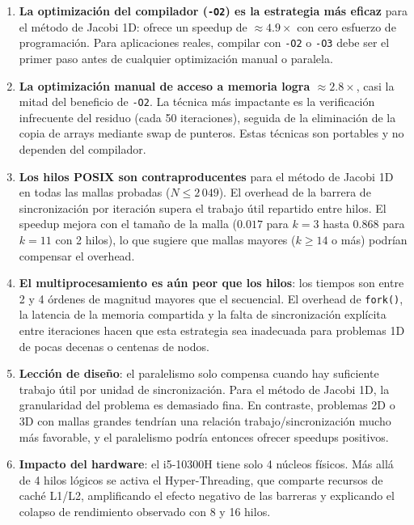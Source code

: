 \documentclass{article}
\begin{document}
\begin{enumerate}

  \item \textbf{La optimización del compilador (\texttt{-O2}) es la estrategia
    más eficaz} para el método de Jacobi 1D: ofrece un speedup de $\approx 4.9\times$
    con cero esfuerzo de programación.  Para aplicaciones reales, compilar con
    \texttt{-O2} o \texttt{-O3} debe ser el primer paso antes de cualquier
    optimización manual o paralela.

  \item \textbf{La optimización manual de acceso a memoria logra $\approx 2.8\times$},
    casi la mitad del beneficio de \texttt{-O2}.  La técnica más impactante es
    la verificación infrecuente del residuo (cada 50 iteraciones), seguida de
    la eliminación de la copia de arrays mediante swap de punteros.  Estas
    técnicas son portables y no dependen del compilador.

  \item \textbf{Los hilos POSIX son contraproducentes} para el método de Jacobi
    1D en todas las mallas probadas ($N \leq 2\,049$).  El overhead de la barrera
    de sincronización por iteración supera el trabajo útil repartido entre hilos.
    El speedup mejora con el tamaño de la malla ($0.017$ para $k=3$ hasta $0.868$
    para $k=11$ con 2 hilos), lo que sugiere que mallas mayores ($k \geq 14$ o
    más) podrían compensar el overhead.

  \item \textbf{El multiprocesamiento es aún peor que los hilos}: los tiempos son
    entre 2 y 4 órdenes de magnitud mayores que el secuencial.  El overhead de
    \texttt{fork()}, la latencia de la memoria compartida y la falta de sincronización
    explícita entre iteraciones hacen que esta estrategia sea inadecuada para
    problemas 1D de pocas decenas o centenas de nodos.

  \item \textbf{Lección de diseño}: el paralelismo solo compensa cuando hay
    suficiente trabajo útil por unidad de sincronización.  Para el método de
    Jacobi 1D, la granularidad del problema es demasiado fina.  En contraste,
    problemas 2D o 3D con mallas grandes tendrían una relación trabajo/sincronización
    mucho más favorable, y el paralelismo podría entonces ofrecer speedups
    positivos.

  \item \textbf{Impacto del hardware}: el i5-10300H tiene solo 4 núcleos físicos.
    Más allá de 4 hilos lógicos se activa el Hyper-Threading, que comparte
    recursos de caché L1/L2, amplificando el efecto negativo de las barreras
    y explicando el colapso de rendimiento observado con 8 y 16 hilos.

\end{enumerate}
\end{document}
